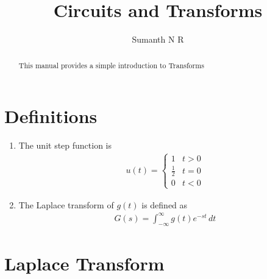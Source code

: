 \documentclass[journal,12pt,twocolumn]{IEEEtran}
\renewcommand\thesection{\arabic{section}}
\begin{document}
\def\putbox#1#2#3{\makebox[0in][l]{\makebox[#1][l]{}\raisebox{\baselineskip}[0in][0in]{\raisebox{#2}[0in][0in]{#3}}}}
     \def\rightbox#1{\makebox[0in][r]{#1}}
     \def\centbox#1{\makebox[0in]{#1}}
     \def\topbox#1{\raisebox{-\baselineskip}[0in][0in]{#1}}
     \def\midbox#1{\raisebox{-0.5\baselineskip}[0in][0in]{#1}}

\vspace{3cm}

\title{ Circuits and Transforms }
\author{ Sumanth N R }
\maketitle
\tableofcontents

\renewcommand{\thefigure}{\theenumi}
\renewcommand{\thetable}{\theenumi}

\bigskip

\begin{abstract}
This manual provides a simple introduction to Transforms
\end{abstract}


\section{Definitions}

\begin{enumerate}[label=\arabic*.,ref=\thesection.\theenumi]

\item The unit step function is 
	\begin{align} u(t) = \begin{cases}
		1 & t > 0 \\
		\frac{1}{2} & t = 0 \\
		0 & t < 0
	\end{cases} \end{align}

\item The Laplace transform of $g(t)$ is defined as 
	\begin{align}
		G(s) = \int_{-\infty}^{\infty} g(t) e^{-st}\, dt
	\end{align}

\end{enumerate}



\section{Laplace Transform}
\end{document}
